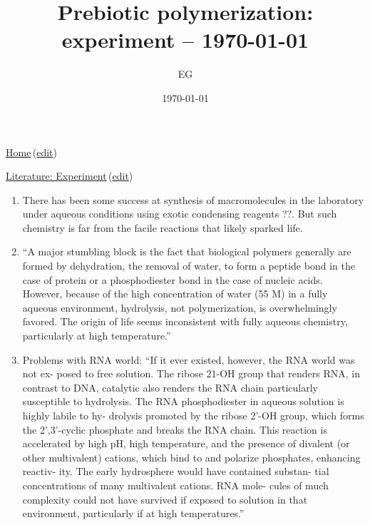 \documentclass[12pt]{paper}
\title{Prebiotic polymerization: experiment -- \today}
\author{EG}
\date{\today}
\newcommand{\wikilink}[2] { \href{#1.pdf}{#2}\,(\href{#1.tex}{edit})}
\begin{document}
 \maketitle
\wikilink{home}{Home}
 
\wikilink{literature\_experiment}{Literature: Experiment}


\begin{enumerate}
 \item  There has been some success at synthesis of macromolecules
 in the laboratory under aqueous conditions using exotic condensing
reagents \cite{Joyce1989}??. But such chemistry is
far from the facile reactions that likely sparked life. 

\item  ``A major stumbling block is the fact that biological polymers generally are formed by 
dehydration, the removal of water, to
form a peptide bond in the case of protein or a phosphodiester bond in the case of nucleic acids. 
However, because of the high concentration of water (55 M) in a fully
aqueous environment, hydrolysis, not polymerization,
 is overwhelmingly favored. The origin of life seems inconsistent with fully aqueous chemistry, 
particularly at high temperature.'' \cite{Pace1991}

\item Problems with RNA world: ``If it ever existed, however, the RNA world was not ex-
posed to free solution. The ribose 21-OH group that renders
RNA, in contrast to DNA, catalytic also renders the RNA
chain particularly susceptible to hydrolysis. The RNA
phosphodiester
 in aqueous solution is highly labile to hy-
drolysis promoted by the ribose 2'-OH group, which forms
the 2',3'-cyclic phosphate and breaks the RNA chain. This
reaction is accelerated by high pH, high temperature, and
the presence of divalent (or other multivalent) cations,
which bind to and polarize phosphates, enhancing reactiv-
ity. The early hydrosphere would have contained substan-
tial concentrations of many multivalent cations. RNA mole-
cules of much complexity could not have survived if
exposed to solution in that environment, particularly if at
high temperatures.''\cite{Pace1991}


\end{enumerate}

 
 
 
 
 
 
 
 
 

   
    
 
\end{document}

